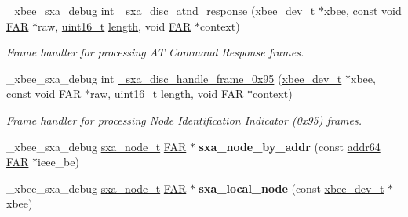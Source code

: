 \begin{DoxyCompactItemize}
\+\_\+xbee\+\_\+sxa\+\_\+debug int \hyperlink{group___s_x_a_gaaa5cd9591d2c4735e4d9df944323ce17}{\+\_\+sxa\+\_\+disc\+\_\+atnd\+\_\+response} (\hyperlink{structxbee__dev__t}{xbee\+\_\+dev\+\_\+t} $\ast$xbee, const void \hyperlink{group__hal_gaef060b3456fdcc093a7210a762d5f2ed}{F\+AR} $\ast$raw, \hyperlink{group__hal__dos_ga5a8b2dc9e45a9ee81a94ef304fb62505}{uint16\+\_\+t} \hyperlink{group__zdo_gab2b3adeb2a67e656ff030b56727fd0ac}{length}, void \hyperlink{group__hal_gaef060b3456fdcc093a7210a762d5f2ed}{F\+AR} $\ast$context)
\begin{DoxyCompactList}\small\item\em Frame handler for processing AT Command Response frames. \end{DoxyCompactList}\item 
\+\_\+xbee\+\_\+sxa\+\_\+debug int \hyperlink{group___s_x_a_gadd7b9ea8d43a02a15c22957b936c8a71}{\+\_\+sxa\+\_\+disc\+\_\+handle\+\_\+frame\+\_\+0x95} (\hyperlink{structxbee__dev__t}{xbee\+\_\+dev\+\_\+t} $\ast$xbee, const void \hyperlink{group__hal_gaef060b3456fdcc093a7210a762d5f2ed}{F\+AR} $\ast$raw, \hyperlink{group__hal__dos_ga5a8b2dc9e45a9ee81a94ef304fb62505}{uint16\+\_\+t} \hyperlink{group__zdo_gab2b3adeb2a67e656ff030b56727fd0ac}{length}, void \hyperlink{group__hal_gaef060b3456fdcc093a7210a762d5f2ed}{F\+AR} $\ast$context)
\begin{DoxyCompactList}\small\item\em Frame handler for processing Node Identification Indicator (0x95) frames. \end{DoxyCompactList}\item 
\mbox{\label{group___s_x_a_gaf2be09cd0493eb7daf5c1b1d32c2cdf8}} 
\+\_\+xbee\+\_\+sxa\+\_\+debug \hyperlink{structsxa__node__t}{sxa\+\_\+node\+\_\+t} \hyperlink{group__hal_gaef060b3456fdcc093a7210a762d5f2ed}{F\+AR} $\ast$ {\bfseries sxa\+\_\+node\+\_\+by\+\_\+addr} (const \hyperlink{unionaddr64}{addr64} \hyperlink{group__hal_gaef060b3456fdcc093a7210a762d5f2ed}{F\+AR} $\ast$ieee\+\_\+be)
\item 
\mbox{\label{group___s_x_a_gaa489c5f8d5296fd609793f3a46f8b62e}} 
\+\_\+xbee\+\_\+sxa\+\_\+debug \hyperlink{structsxa__node__t}{sxa\+\_\+node\+\_\+t} \hyperlink{group__hal_gaef060b3456fdcc093a7210a762d5f2ed}{F\+AR} $\ast$ {\bfseries sxa\+\_\+local\+\_\+node} (const \hyperlink{structxbee__dev__t}{xbee\+\_\+dev\+\_\+t} $\ast$xbee)
\item 
\mbox{\label{group___s_x_a_ga0b1c597794cd34a06c04b1a8d7a67985}} 

\end{DoxyCompactItemize}
